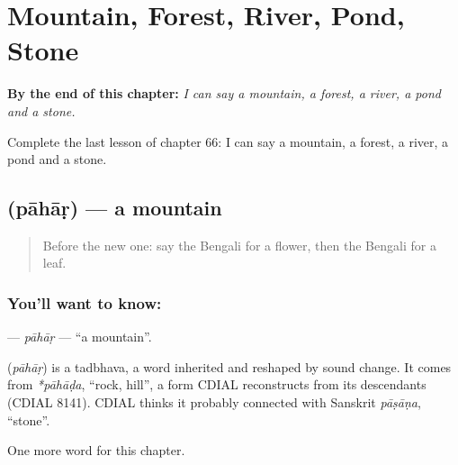 
\chapter{Mountain, Forest, River, Pond, Stone}
\label{ch:bn-mountain-forest-river-pond-stone}

\begin{chapteropening}
\textbf{By the end of this chapter:} \emph{I can say a mountain, a forest, a river, a pond and a stone.}

Complete the last lesson of chapter 66: I can say a mountain, a forest, a river, a pond and a stone.
\end{chapteropening}

\section[\texorpdfstring{\bn{পাহাড়} (pāhāṛ)}{পাহাড় (pāhāṛ)}]{ (pāhāṛ) — a mountain}

\label{lesson:BN-C66-pahar}



\begin{quote}
Before the new one: say the Bengali for a flower, then the Bengali for a leaf.
\end{quote}

\subsection*{You'll want to know: }
\textbf{} — \emph{pāhāṛ} — \textquotedblleft{}a mountain\textquotedblright{}.

\begin{cousinweb}
\textbf{} (\emph{pāhāṛ}) is a tadbhava, a word inherited and reshaped by sound change. It comes from \emph{*pāhāḍa}, \textquotedblleft{}rock, hill\textquotedblright{}, a form CDIAL reconstructs from its descendants (CDIAL 8141). CDIAL thinks it probably connected with Sanskrit \emph{pāṣāṇa}, \textquotedblleft{}stone\textquotedblright{}.
\end{cousinweb}

\begin{grammarlens}[title={What you've built}]
One more word for this chapter.
\end{grammarlens}

